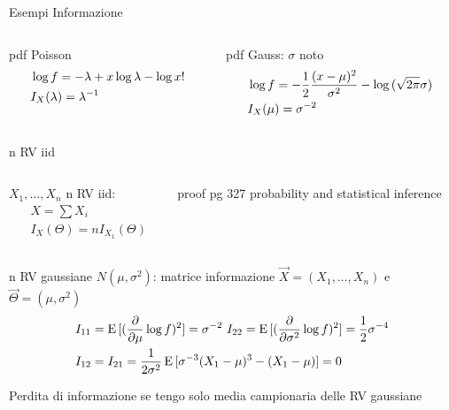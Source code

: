 \documentclass[asd-beamer.tex]{subfiles}%
\begin{document}
\begin{frame}{Esempi Informazione}
\begin{columns}[T]
\begin{column}{0.5\textwidth}
	\begin{block}{pdf Poisson}
		\begin{align*}
		&\log{f}=-\lambda+x\log{\lambda}-\log{x!}\\
		&I_X(\lambda)={\lambda}^{-1}
		\end{align*}
	\end{block}
\end{column}
\begin{column}{0.5\textwidth}
	\begin{block}{pdf Gauss: $\sigma$ noto}
		\begin{align*}
		&\log{f}=-\frac{1}{2}\frac{(x-\mu)^2}{\sigma^2}-\log{(\sqrt{2\pi}\sigma)}\\
		&I_X(\mu)=\sigma^{-2}
		\end{align*}
	\end{block}
\end{column}
\end{columns}
\begin{block}{n RV iid}
\begin{columns}[T]
	\begin{column}{0.5\textwidth}
		$X_1,\ldots,X_n$ n RV iid:
		\begin{align*}
		&X=\sum X_i\\
		&I_X(\Theta)=nI_{X_1}(\Theta)
		\end{align*}
	\end{column}
	\begin{column}{0.5\textwidth}
		proof pg 327 probability and statistical inference
	\end{column}
\end{columns}
\end{block}
\begin{block}{n RV gaussiane $N(\mu,\sigma^2)$: matrice informazione}
$\vec{X}=(X_1,\ldots,X_n)$ e $\vec{\Theta}=(\mu,\sigma^2)$
\begin{align*}
&I_{11}=\E{[(\PDof{\mu}\log{f})^2]}=\sigma\expy{-2}\ I_{22}=\E{[(\PDof{\sigma^2}\log{f})^2]}=\frac{1}{2}\sigma\expy{-4}\\
&I_{12}=I_{21}=\frac{1}{2\sigma^2}\E{[\sigma\expy{-3}(X_1-\mu)^3-(X_1-\mu)]}=0
\end{align*}
\end{block}
\begin{block}{Perdita di informazione se tengo solo media campionaria delle RV gaussiane}

\end{block}
\end{frame}
\end{document}
